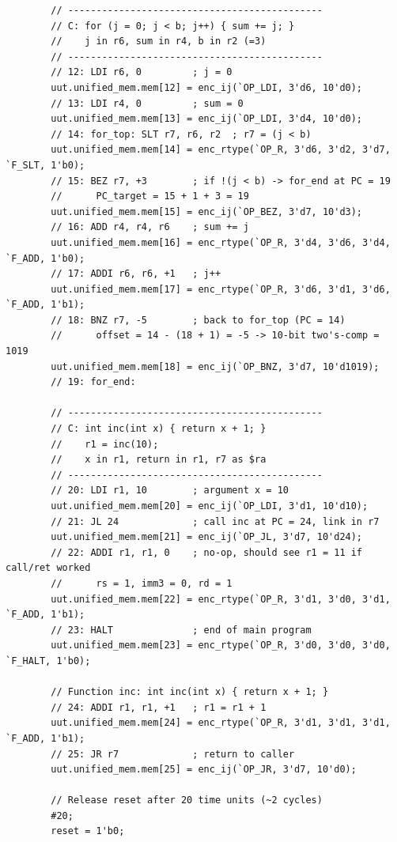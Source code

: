 \documentclass[12pt]{report}
\begin{document}
\begin{lstlisting}
        // ---------------------------------------------
        // C: for (j = 0; j < b; j++) { sum += j; }
        //    j in r6, sum in r4, b in r2 (=3)
        // ---------------------------------------------
        // 12: LDI r6, 0         ; j = 0
        uut.unified_mem.mem[12] = enc_ij(`OP_LDI, 3'd6, 10'd0);
        // 13: LDI r4, 0         ; sum = 0
        uut.unified_mem.mem[13] = enc_ij(`OP_LDI, 3'd4, 10'd0);
        // 14: for_top: SLT r7, r6, r2  ; r7 = (j < b)
        uut.unified_mem.mem[14] = enc_rtype(`OP_R, 3'd6, 3'd2, 3'd7, `F_SLT, 1'b0);
        // 15: BEZ r7, +3        ; if !(j < b) -> for_end at PC = 19
        //      PC_target = 15 + 1 + 3 = 19
        uut.unified_mem.mem[15] = enc_ij(`OP_BEZ, 3'd7, 10'd3);
        // 16: ADD r4, r4, r6    ; sum += j
        uut.unified_mem.mem[16] = enc_rtype(`OP_R, 3'd4, 3'd6, 3'd4, `F_ADD, 1'b0);
        // 17: ADDI r6, r6, +1   ; j++
        uut.unified_mem.mem[17] = enc_rtype(`OP_R, 3'd6, 3'd1, 3'd6, `F_ADD, 1'b1);
        // 18: BNZ r7, -5        ; back to for_top (PC = 14)
        //      offset = 14 - (18 + 1) = -5 -> 10-bit two's-comp = 1019
        uut.unified_mem.mem[18] = enc_ij(`OP_BNZ, 3'd7, 10'd1019);
        // 19: for_end:

        // ---------------------------------------------
        // C: int inc(int x) { return x + 1; }
        //    r1 = inc(10);
        //    x in r1, return in r1, r7 as $ra
        // ---------------------------------------------
        // 20: LDI r1, 10        ; argument x = 10
        uut.unified_mem.mem[20] = enc_ij(`OP_LDI, 3'd1, 10'd10);
        // 21: JL 24             ; call inc at PC = 24, link in r7
        uut.unified_mem.mem[21] = enc_ij(`OP_JL, 3'd7, 10'd24);
        // 22: ADDI r1, r1, 0    ; no-op, should see r1 = 11 if call/ret worked
        //      rs = 1, imm3 = 0, rd = 1
        uut.unified_mem.mem[22] = enc_rtype(`OP_R, 3'd1, 3'd0, 3'd1, `F_ADD, 1'b1);
        // 23: HALT              ; end of main program
        uut.unified_mem.mem[23] = enc_rtype(`OP_R, 3'd0, 3'd0, 3'd0, `F_HALT, 1'b0);

        // Function inc: int inc(int x) { return x + 1; }
        // 24: ADDI r1, r1, +1   ; r1 = r1 + 1
        uut.unified_mem.mem[24] = enc_rtype(`OP_R, 3'd1, 3'd1, 3'd1, `F_ADD, 1'b1);
        // 25: JR r7             ; return to caller
        uut.unified_mem.mem[25] = enc_ij(`OP_JR, 3'd7, 10'd0);

        // Release reset after 20 time units (~2 cycles)
        #20;
        reset = 1'b0;


\end{lstlisting}
\end{document}
